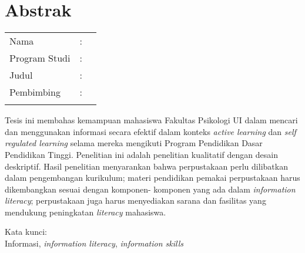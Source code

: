 %
%
%

\chapter*{Abstrak}

\vspace*{0.2cm}
{
	\setlength{\parindent}{0pt}
	
	\begin{tabular}{@{}l l p{10cm}}
		Nama&: & \penulis \\
		Program Studi&: & \program \\
		Judul&: & \judul \\
		Pembimbing&: & \pembimbing \\
				  &  & \pembimbingDua \\
	\end{tabular}

	\bigskip
	\bigskip

	Tesis ini membahas kemampuan mahasiswa Fakultas Psikologi UI dalam mencari dan
	menggunakan informasi secara efektif dalam konteks \textit{active learning} dan \textit{self regulated
	learning} selama mereka mengikuti Program Pendidikan Dasar Pendidikan Tinggi.
	Penelitian ini adalah penelitian kualitatif dengan desain deskriptif. Hasil penelitian
	menyarankan bahwa perpustakaan perlu dilibatkan dalam pengembangan kurikulum;
	materi pendidikan pemakai perpustakaan harus dikembangkan sesuai dengan komponen-
	komponen yang ada dalam \textit{information literacy}; perpustakaan juga harus menyediakan
	sarana dan fasilitas yang mendukung peningkatan \textit{literacy} mahasiswa.

	\bigskip

	Kata kunci:\\
	Informasi, \textit{information literacy}, \textit{information skills}
}

\newpage